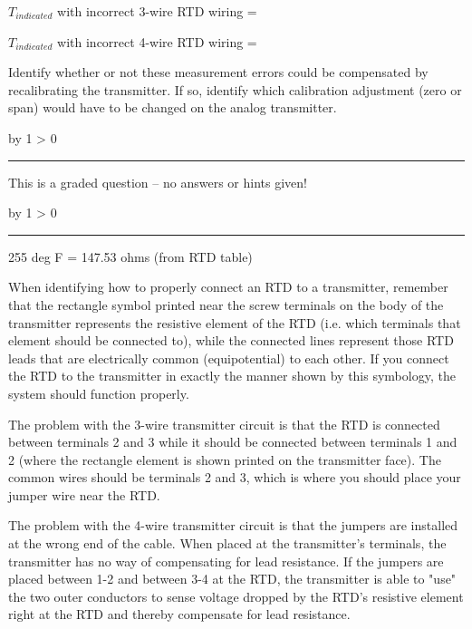 \documentclass[12pt,a4paper]{article}
\def\svar{
           \advance\answnum by 1
           \ifnum \answnum > 0
                \hrule
                \vskip 3pt
                \leftline{Svar \the\answnum}
                \vskip 3pt \fi}
\def\notes{
           \advance\explnum by 1
           \ifnum \explnum > 0
                \hrule
                \vskip 3pt
                \leftline{Notes \the\explnum}
                \vskip 3pt \fi}
\begin{document}
$T_{indicated}$ with incorrect 3-wire RTD wiring = \underbar{\hskip 50pt}

\vskip 20pt

$T_{indicated}$ with incorrect 4-wire RTD wiring = \underbar{\hskip 50pt}

\vskip 10pt

Identify whether or not these measurement errors could be compensated by recalibrating the transmitter.  If so, identify which calibration adjustment (zero or span) would have to be changed on the analog transmitter.

\vfil 

\eject
\vskip 10pt \filbreak 





\svar{} 

This is a graded question -- no answers or hints given!

\vskip 10pt \filbreak 





\notes{} 

255 deg F = 147.53 ohms (from RTD table)

\vskip 10pt

When identifying how to properly connect an RTD to a transmitter, remember that the rectangle symbol printed near the screw terminals on the body of the transmitter represents the resistive element of the RTD (i.e. which terminals that element should be connected to), while the connected lines represent those RTD leads that are electrically common (equipotential) to each other.  If you connect the RTD to the transmitter in exactly the manner shown by this symbology, the system should function properly.

\vskip 10pt

The problem with the 3-wire transmitter circuit is that the RTD is connected between terminals 2 and 3 while it should be connected between terminals 1 and 2 (where the rectangle element is shown printed on the transmitter face).  The common wires should be terminals 2 and 3, which is where you should place your jumper wire near the RTD.

The problem with the 4-wire transmitter circuit is that the jumpers are installed at the wrong end of the cable.  When placed at the transmitter's terminals, the transmitter has no way of compensating for lead resistance.  If the jumpers are placed between 1-2 and between 3-4 at the RTD, the transmitter is able to "use" the two outer conductors to sense voltage dropped by the RTD's resistive element right at the RTD and thereby compensate for lead resistance.
\end{document}
